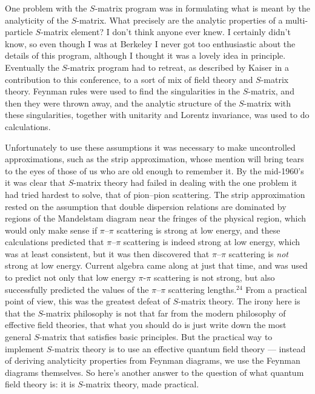 One problem with the $S$-matrix program was in formulating
what is meant by the analyticity of the $S$-matrix.    What
precisely are the analytic properties of a multi-particle
$S$-matrix element?  I don't think anyone ever knew.  I
certainly didn't know, so even though I was at Berkeley I
never got too enthusiastic about the details of this
program, although I thought it was a lovely idea in
principle. Eventually the $S$-matrix program had to retreat,
as described by Kaiser in a contribution to this conference,
to a sort of mix of field theory and $S$-matrix theory.
Feynman rules were used to find the singularities in the
$S$-matrix, and then they were thrown away, and the analytic
structure of the $S$-matrix with these singularities,
together with unitarity and Lorentz invariance, was used to
do calculations.

Unfortunately to use these assumptions it was necessary to
make uncontrolled approximations, such as the strip
approximation, whose mention will bring tears to the eyes of
those of us who are old enough to remember it.  By the
mid-1960's it was clear that $S$-matrix theory had failed in
dealing with the one problem it had tried hardest to solve,
that of pion--pion scattering.  The strip approximation
rested on the assumption that double dispersion relations
are dominated by regions of the Mandelstam diagram near the
fringes of the physical region, which  would only make sense
if $\pi$--$\pi$ scattering is strong at low energy, and
these calculations  predicted that $\pi$--$\pi$ scattering
is indeed strong at low energy, which was at least
consistent, but it was then discovered that $\pi$--$\pi$
scattering is {\em not} strong at low energy.  Current
algebra came along at just that time, and was used to
predict not only that low energy $\pi$-$\pi$ scattering is
not strong, but also successfully predicted the values of
the $\pi$--$\pi$ scattering lengths.$^{24}$ From a practical
point
of view, this was the greatest defeat of $S$-matrix theory.
The irony here is that the $S$-matrix philosophy is not that
far from the modern philosophy of effective field theories,
that what you should do is just write down the most general
$S$-matrix  that satisfies basic principles.  But the
practical way to implement $S$-matrix theory is to use an
effective quantum field theory --- instead of deriving
analyticity properties from Feynman diagrams, we use the
Feynman diagrams themselves.  So here's another answer to
the question of what quantum field theory is: it is
$S$-matrix theory, made practical.

